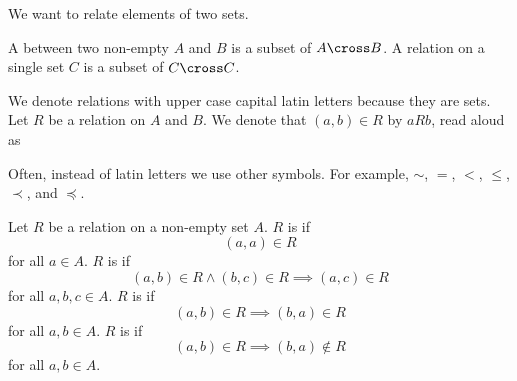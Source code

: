 
\sbasic




\sstart


We want to relate elements
of two sets.



A
between two non-empty
$A$ and $B$ is a subset of
$A \cross B$.
A relation on a single set
$C$ is a subset of $C \cross C$.

We denote relations with upper
case capital latin letters because
they are sets.
Let $R$ be a relation on $A$ and $B$.
We denote that $(a, b) \in R$ by
$a R b$, read aloud as

Often, instead of latin letters we use
other symbols.
For example,
$\sim$, $=$, $<$,
$\leq$, $\prec$, and $\preceq$.


Let $R$ be a relation on
a non-empty set $A$.
$R$ is  if
$$(a, a) \in R$$
for all $a \in A$.
$R$ is  if
$$(a, b) \in R \land (b, c) \in R \implies (a, c) \in R$$
for all $a, b, c \in A$.
$R$ is  if
$$(a, b) \in R \implies (b, a) \in R$$
for all $a, b \in A$.
$R$ is  if
$$(a, b) \in R \implies (b, a) \not\in R$$
for all $a, b \in A$.

\strats
